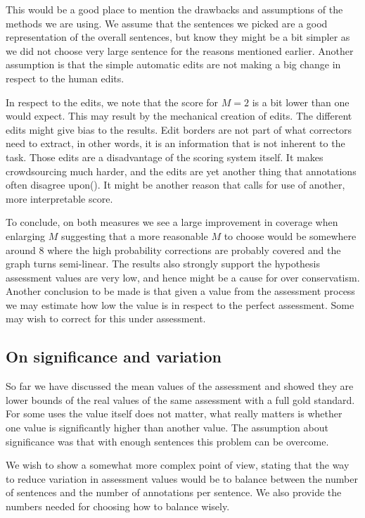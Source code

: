 \documentclass[english]{article}
\begin{document}
This would be a good place to mention the drawbacks and assumptions of the methods we are using. We assume that the sentences we picked are a good representation of the overall sentences, but know they might be a bit simpler as we did not choose very large sentence for the reasons mentioned earlier. Another assumption is that the simple automatic edits are not making a big change in respect to the human edits.

In respect to the edits, we note that the score for $M=2$ is a bit lower than one would expect. This may result by the mechanical creation of edits. The different edits might give bias to the results. Edit borders are not part of what correctors need to extract, in other words, it is an information that is not inherent to the task. Those edits are a disadvantage of the scoring system itself. It makes crowdsourcing much harder, and the edits are yet another thing that annotations often disagree upon(\cite{dahlmeier2012better}). It might be another reason that calls for use of another, more interpretable score.

To conclude, on both measures we see a large improvement in coverage when enlarging $M$ suggesting that a more reasonable $M$ to choose would be somewhere around 8 where the high probability corrections are probably covered and the graph turns semi-linear. The results also strongly support the hypothesis assessment values are very low, and hence might be a cause for over conservatism.
 Another conclusion to be made is that given a value from the assessment process we may estimate how low the value is in respect to the perfect assessment. Some may wish to correct for this under assessment.

\subsection{On significance and variation}

So far we have discussed the mean values of the assessment and showed they are lower bounds of the real values of the same assessment with a full gold standard. For some uses the value itself does not matter, what really matters is whether one value is significantly higher than another value. The assumption about significance was that with enough sentences this problem can be overcome.

We wish to show a somewhat more complex point of view, stating that the way to reduce variation in assessment values would be to balance between the number of sentences and the number of annotations per sentence. We also provide the numbers needed for choosing how to balance wisely. 
\end{document}
